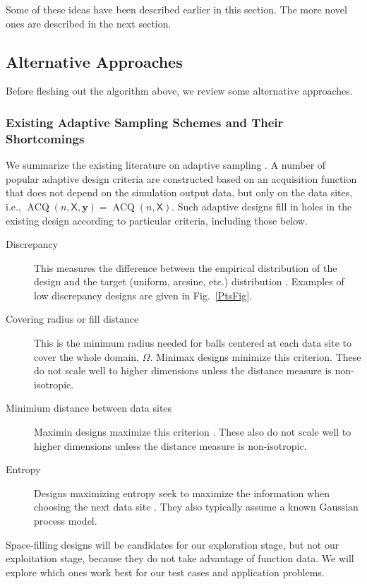\documentclass[11pt]{NSFamsart}
\DeclareMathOperator{\VAL}{ACQ}
\newcommand{\mX}{\mathsf{X}}
\newcommand{\by}{{\boldsymbol{y}}}
\begin{document}
Some of these ideas have been described earlier in this section.  The more novel ones are described in the next section.

\subsection{Alternative Approaches}
Before fleshing out the algorithm above, we review some alternative  approaches.

\subsubsection{Existing Adaptive Sampling Schemes and Their Shortcomings} \label{sec:shortExist}

We summarize the existing literature on adaptive sampling \cite{aute2013cross,burnaev2015adaptive,fu2017adaptive,gramacy2008adaptive,jin2002sequential,kleijnen2004application}. A number of popular adaptive design criteria are constructed based on an acquisition function that does not depend on the simulation output data, but only on the data sites, i.e., $\VAL(n,\mX,\by) = \VAL(n,\mX)$. Such adaptive designs fill in holes in the existing design according to particular criteria, including those below. 
\begin{description}
	\item[Discrepancy] This measures the difference between the empirical distribution of the design and the target (uniform, arcsine, etc.) distribution \cite{FangEtal19a}. Examples of low discrepancy designs are given in Fig.\ \ref{PtsFig}. 
	\item[Covering radius or fill distance] This is the minimum radius needed for balls centered at each data site to cover the whole domain, $\Omega$. Minimax designs minimize this criterion.  These do not scale well to higher dimensions unless the distance measure is non-isotropic.
	\item[Minimium distance between data sites] Maximin designs maximize this criterion \cite{jin2002sequential}.  These also do not scale well to higher dimensions unless the distance measure is non-isotropic.
	\item[Entropy] Designs maximizing entropy seek to maximize the information when choosing the next data site \cite{jin2002sequential}. They also typically assume a known Gaussian process model.
\end{description}
Space-filling designs will be candidates for our exploration stage, but not our exploitation stage, because they do not take advantage of function data.  We will explore which ones work best for our test cases and application problems.
\end{document}
